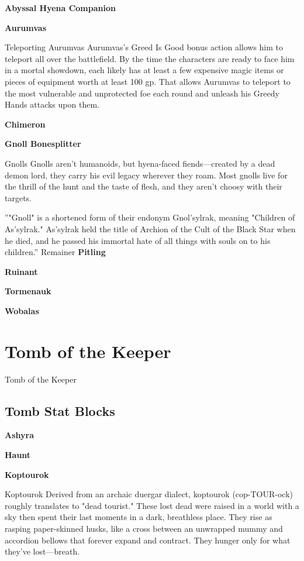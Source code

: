 \documentclass[10pt,a4paper,twoside,bg=print,twocolumn,openany,nodeprecatedcode]{dndbook}
\begin{document}
\textbf{Abyssal Hyena Companion}

\textbf{Aurumvas}

\begin{DndSidebar}[float=!b]{Teleporting Aurumvas}
Aurumvas's Greed Is Good bonus action allows him to teleport all over the battlefield. By the time the characters are ready to face him in a mortal showdown, each likely has at least a few expensive magic items or pieces of equipment worth at least 100 gp. That allows Aurumvas to teleport to the most vulnerable and unprotected foe each round and unleash his Greedy Hands attacks upon them.



\end{DndSidebar}

\textbf{Chimeron}

\textbf{Gnoll Bonesplitter}

\begin{DndSidebar}[float=!b]{Gnolls}
Gnolls aren't humanoids, but hyena-faced fiends—created by a dead demon lord, they carry his evil legacy wherever they roam. Most gnolls live for the thrill of the hunt and the taste of flesh, and they aren't choosy with their targets.



\end{DndSidebar}

\DndQuote%
{}
{''"Gnoll" is a shortened form of their endonym Gnol'sylrak, meaning "Children of As'sylrak." As'sylrak held the title of Archion of the Cult of the Black Star when he died, and he passed his immortal hate of all things with souls on to his children.''}
{Remainer}
\textbf{Pitling}

\textbf{Ruinant}

\textbf{Tormenauk}

\textbf{Wobalas}

\chapter{Tomb of the Keeper}
Tomb of the Keeper

\section{Tomb Stat Blocks}
\textbf{Ashyra}

\textbf{Haunt}

\textbf{Koptourok}

\begin{DndSidebar}[float=!b]{Koptourok}
Derived from an archaic duergar dialect, koptourok (cop-TOUR-ock) roughly translates to "dead tourist." These lost dead were raised in a world with a sky then spent their last moments in a dark, breathless place. They rise as rasping paper-skinned husks, like a cross between an unwrapped mummy and accordion bellows that forever expand and contract. They hunger only for what they've lost—breath.



\end{DndSidebar}
\end{document}
